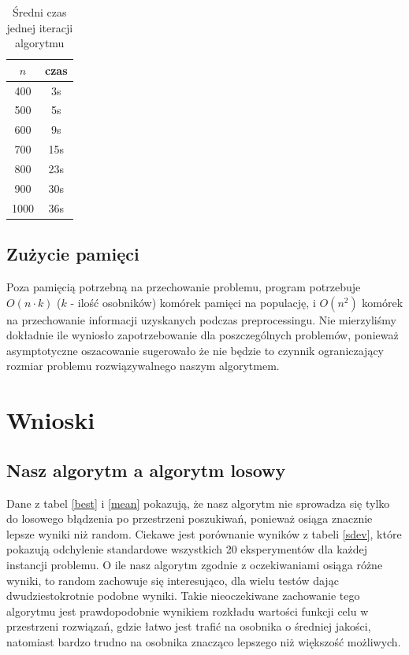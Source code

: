 \documentclass[11pt, a4wide]{mwart}
\begin{document}
\begin{table}[H]
\caption{Średni czas jednej iteracji algorytmu}
\label{czas}
\begin{center}
\begin{tabular}{c|c}
  \hline
  $n$ & czas \\
  \hline
  400 & 3s \\
  500 & 5s \\
  600 & 9s \\
  700 & 15s \\
  800 & 23s \\
  900 & 30s \\
  1000 & 36s \\
\end{tabular}
\end{center}
\end{table}





\subsection{Zużycie pamięci}
Poza pamięcią potrzebną na przechowanie problemu, program potrzebuje $O(n \cdot
k)$ ($k$ - ilość osobników) komórek pamięci na populację, i $O(n^2)$ komórek na
przechowanie informacji uzyskanych podczas preprocessingu. Nie mierzyliśmy
dokładnie ile wyniosło zapotrzebowanie dla poszczególnych problemów, ponieważ
asymptotyczne oszacowanie sugerowało że nie będzie to czynnik ograniczający
rozmiar problemu rozwiązywalnego naszym algorytmem.




\section{Wnioski}

\subsection{Nasz algorytm a algorytm losowy}
Dane z tabel \ref{best} i \ref{mean} pokazują, że nasz algorytm nie sprowadza
się tylko do losowego błądzenia po przestrzeni poszukiwań, ponieważ osiąga
znacznie lepsze wyniki niż random. Ciekawe jest porównanie wyników z tabeli
\ref{sdev}, które pokazują odchylenie standardowe wszystkich 20 eksperymentów
dla każdej instancji problemu. O ile nasz algorytm zgodnie z oczekiwaniami
osiąga różne wyniki, to random zachowuje się interesująco, dla wielu testów
dając dwudziestokrotnie podobne wyniki.  Takie nieoczekiwane zachowanie tego
algorytmu jest prawdopodobnie wynikiem rozkładu wartości funkcji celu w
przestrzeni rozwiązań, gdzie łatwo jest trafić na osobnika o średniej jakości,
natomiast bardzo trudno na osobnika znacząco lepszego niż większość możliwych.
\end{document}
